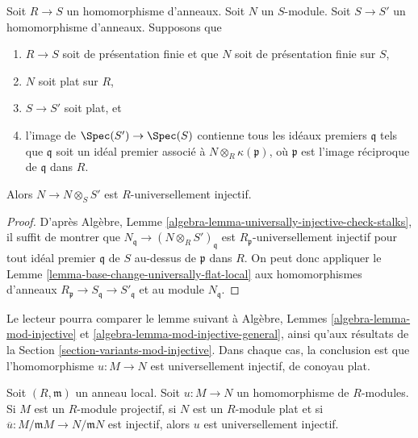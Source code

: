 \begin{lemma}
\label{lemma-base-change-universally-flat}
Soit $R \to S$ un homomorphisme d'anneaux.
Soit $N$ un $S$-module.
Soit $S \to S'$ un homomorphisme d'anneaux.
Supposons que
\begin{enumerate}
\item $R \to S$ soit de présentation finie et que $N$ soit de présentation finie
sur $S$,
\item $N$ soit plat sur $R$,
\item $S \to S'$ soit plat, et
\item l'image de $\Spec(S') \to \Spec(S)$ contienne
tous les idéaux premiers $\mathfrak q$ tels que $\mathfrak q$ soit un idéal premier associé
à $N \otimes_R \kappa(\mathfrak p)$, où $\mathfrak p$ est l'image
réciproque de $\mathfrak q$ dans $R$.
\end{enumerate}
Alors $N \to N \otimes_S S'$ est $R$-universellement injectif.
\end{lemma}

\begin{proof}
D'après
Algèbre, Lemme \ref{algebra-lemma-universally-injective-check-stalks},
il suffit de montrer que $N_{\mathfrak q} \to (N \otimes_R S')_{\mathfrak q}$
est $R_{\mathfrak p}$-universellement injectif pour tout idéal premier $\mathfrak q$
de $S$ au-dessus de $\mathfrak p$ dans $R$. On peut donc appliquer
le Lemme \ref{lemma-base-change-universally-flat-local}
aux homomorphismes d'anneaux
$R_{\mathfrak p} \to S_{\mathfrak q} \to S'_{\mathfrak q}$
et au module $N_{\mathfrak q}$.
\end{proof}

\noindent
Le lecteur pourra comparer le lemme suivant à
Algèbre, Lemmes \ref{algebra-lemma-mod-injective} et
\ref{algebra-lemma-mod-injective-general}, ainsi qu'aux résultats de la
Section \ref{section-variants-mod-injective}.
Dans chaque cas, la conclusion est que l'homomorphisme $u : M \to N$ est
universellement injectif, de conoyau plat.

\begin{lemma}
\label{lemma-universally-injective-local}
Soit $(R, \mathfrak m)$ un anneau local. Soit $u : M \to N$ un homomorphisme de $R$-modules.
Si $M$ est un $R$-module projectif, si $N$ est un $R$-module plat et si
$\overline{u} : M/\mathfrak mM \to N/\mathfrak mN$ est injectif,
alors $u$ est universellement injectif.
\end{lemma}

